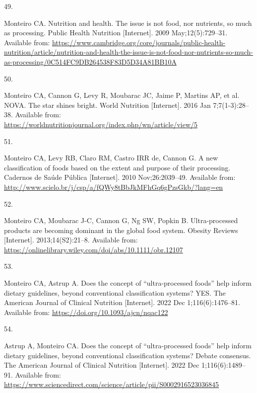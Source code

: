 \documentclass[
]{article}
\newlength{\cslhangindent}
\newlength{\csllabelwidth}
\newlength{\cslentryspacingunit} %
\newenvironment{CSLReferences}[2] %
 {%
  \setlength{\parindent}{0pt}
  \ifodd #1
  \let\oldpar\par
  \def\par{\hangindent=\cslhangindent\oldpar}
  \fi
  \setlength{\parskip}{#2\cslentryspacingunit}
 }%
 {}
\newcommand{\CSLLeftMargin}[1]{\parbox[t]{\csllabelwidth}{#1}}
\newcommand{\CSLRightInline}[1]{\parbox[t]{\linewidth - \csllabelwidth}{#1}\break}
\begin{document}
\begin{CSLReferences}{0}{0}
\leavevmode{}%
\CSLLeftMargin{49. }%
\CSLRightInline{Monteiro CA. Nutrition and health. The issue is not
food, nor nutrients, so much as processing. Public Health Nutrition
{[}Internet{]}. 2009 May;12(5):729--31. Available from:
\url{https://www.cambridge.org/core/journals/public-health-nutrition/article/nutrition-and-health-the-issue-is-not-food-nor-nutrients-so-much-as-processing/0C514FC9DB264538F83D5D34A81BB10A}}

\leavevmode{}%
\CSLLeftMargin{50. }%
\CSLRightInline{Monteiro CA, Cannon G, Levy R, Moubarac JC, Jaime P,
Martins AP, et al. NOVA. The star shines bright. World Nutrition
{[}Internet{]}. 2016 Jan 7;7(1-3):28--38. Available from:
\url{https://worldnutritionjournal.org/index.php/wn/article/view/5}}

\leavevmode{}%
\CSLLeftMargin{51. }%
\CSLRightInline{Monteiro CA, Levy RB, Claro RM, Castro IRR de, Cannon G.
A new classification of foods based on the extent and purpose of their
processing. Cadernos de Saúde Pública {[}Internet{]}. 2010
Nov;26:2039--49. Available from:
\url{http://www.scielo.br/j/csp/a/fQWy8tBbJkMFhGq6gPzsGkb/?lang=en}}

\leavevmode{}%
\CSLLeftMargin{52. }%
\CSLRightInline{Monteiro CA, Moubarac J-C, Cannon G, Ng SW, Popkin B.
Ultra-processed products are becoming dominant in the global food
system. Obesity Reviews {[}Internet{]}. 2013;14(S2):21--8. Available
from: \url{https://onlinelibrary.wiley.com/doi/abs/10.1111/obr.12107}}

\leavevmode{}%
\CSLLeftMargin{53. }%
\CSLRightInline{Monteiro CA, Astrup A. Does the concept of
{``}ultra-processed foods{''} help inform dietary guidelines, beyond
conventional classification systems? YES. The American Journal of
Clinical Nutrition {[}Internet{]}. 2022 Dec 1;116(6):1476--81. Available
from: \url{https://doi.org/10.1093/ajcn/nqac122}}

\leavevmode{}%
\CSLLeftMargin{54. }%
\CSLRightInline{Astrup A, Monteiro CA. Does the concept of
{``}ultra-processed foods{''} help inform dietary guidelines, beyond
conventional classification systems? Debate consensus. The American
Journal of Clinical Nutrition {[}Internet{]}. 2022 Dec
1;116(6):1489--91. Available from:
\url{https://www.sciencedirect.com/science/article/pii/S0002916523036845}}


\end{CSLReferences}
\end{document}
